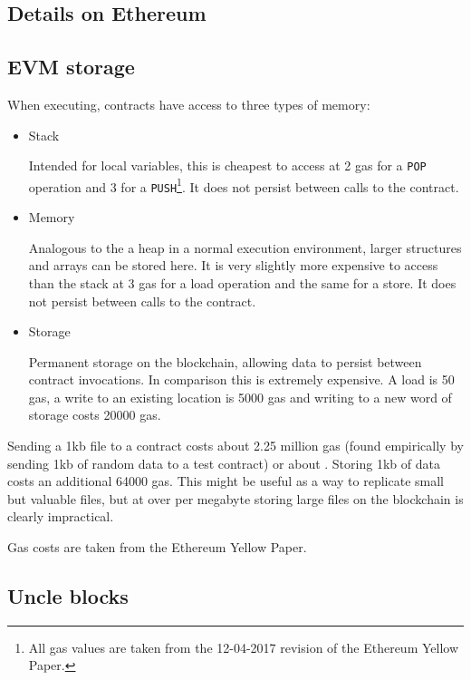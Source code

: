 \documentclass[12pt,a4paper,twoside,openright]{report}
\begin{document}
\begin{appendices}
\chapter{Details on Ethereum}

\section{EVM storage}\label{evm-mem}

When executing, contracts have access to three types of memory:

\begin{itemize}
\item Stack

Intended for local variables, this is cheapest to access at 2 gas for a \texttt{POP} operation and 3 for a \texttt{PUSH}\footnote{All gas values are taken from the
12-04-2017 revision of the Ethereum Yellow Paper\cite{eth-yellowpaper}.}.
It does not persist between calls to the contract.

\item Memory

Analogous to the a heap in a normal execution environment, larger structures and arrays can be stored here.
It is very slightly more expensive to access than the stack at 3 gas for a load operation and the same for a store.
It does not persist between calls to the contract.

\item Storage

Permanent storage on the blockchain, allowing data to persist between contract invocations.
In comparison this is extremely expensive.
A load is 50 gas, a write to an existing location is 5000 gas and writing to a new word of storage costs 20000 gas.
\end{itemize}

Sending a 1kb file to a contract costs about 2.25 million gas (found empirically by sending 1kb of random data to a test contract)
or about .
Storing 1kb of data costs an additional 64000 gas.
This might be useful as a way to replicate small but valuable files, but at over  per megabyte
storing large files on the blockchain is clearly impractical.

Gas costs are taken from the Ethereum Yellow Paper\cite{eth-yellowpaper}.


\section{Uncle blocks}\label{app-uncle}


\end{appendices}
\end{document}
